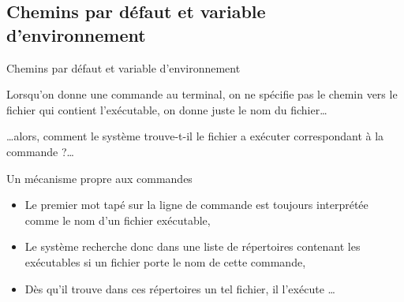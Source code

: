 \subsection{Chemins par défaut et variable d'environnement}
\begin{frame}{Chemins par défaut et variable d'environnement}
  \begin{alertblock}{Lorsqu'on donne une commande au terminal, on ne spécifie
      pas le chemin vers le fichier qui contient l'exécutable, on donne juste
      le nom du fichier\dots}
  \end{alertblock}
  \begin{center}
  \end{center}
  \begin{alertblock}{\dots alors, comment le système trouve-t-il le fichier a
      exécuter correspondant à la commande ?\dots}
  \end{alertblock}
  \begin{block}{Un mécanisme propre aux commandes}
    \begin{itemize}
    \item Le premier mot tapé sur la ligne de commande est toujours
      interprétée comme le nom d'un fichier exécutable,
    \item Le système recherche donc dans une liste de répertoires contenant
      les exécutables si un fichier porte le nom de cette commande,
    \item Dès qu'il trouve dans ces répertoires un tel fichier, il l'exécute
      \dots
    \end{itemize}
  \end{block}
\end{frame}


